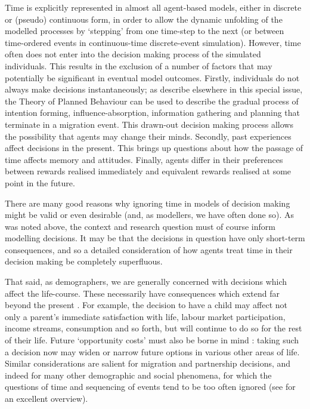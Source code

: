 \documentclass{article}
\begin{document}
Time is explicitly represented in almost all agent-based models, either in discrete or (pseudo) continuous form, in order to allow the dynamic unfolding of the modelled processes by `stepping' from one time-step to the next (or between time-ordered events in continuous-time discrete-event simulation). However, time often  does not enter into the decision making process of the simulated individuals. This results in the exclusion of a number of factors that may potentially be significant in eventual model outcomes. Firstly, individuals do not always make decisions instantaneously; as \cite{Willekens2017} describe elsewhere in this special issue, the Theory of Planned Behaviour \citep{Ajzen1991} can be used to describe the gradual process of intention forming, influence-absorption, information gathering and planning that terminate in a migration event. This drawn-out decision making process allows the possibility that agents may change their minds. Secondly, past experiences affect decisions in the present. This brings up questions about how the passage of time affects memory and attitudes. Finally, agents differ in their preferences between rewards realised immediately and equivalent rewards realised at some point in the future.

There are many good reasons why ignoring time in models of decision making might be valid or even desirable (and, as modellers, we have often done so). As was noted above, the context and research question must of course inform modelling decisions. It may be that the decisions in question have only short-term consequences, and so a detailed consideration of how agents treat time in their decision making be completely superfluous.

That said, as demographers, we are generally concerned with decisions which affect the life-course. These necessarily have consequences which extend far beyond the present \citep{Willekens2001}. For example, the decision to have a child may affect not only a parent's immediate satisfaction with life, labour market participation, income streams, consumption and so forth, but will continue to do so for the rest of their life. Future `opportunity costs' must also be borne in mind \citep{Butz1979}: taking such a decision now may widen or narrow future options in various other areas of life. Similar considerations are salient for migration and partnership decisions, and indeed for many other demographic and social phenomena, for which the questions of time and sequencing of events tend to be too often ignored (see \citet{Abbott2001} for an excellent overview).
\end{document}
